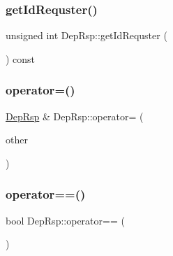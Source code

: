 \mbox{\label{class_dep_rsp_a3c858b0cb735e9e6309e8bf25bf272dd}} 
\subsubsection{\texorpdfstring{get\+Id\+Requster()}{getIdRequster()}}
{\footnotesize\ttfamily unsigned int Dep\+Rsp\+::get\+Id\+Requster (\begin{DoxyParamCaption}{ }\end{DoxyParamCaption}) const\hspace{0.3cm}{\ttfamily [virtual]}}

\mbox{\label{class_dep_rsp_a3297f65b6eb05d7d5d203562b4d48c4a}} 
\subsubsection{\texorpdfstring{operator=()}{operator=()}}
{\footnotesize\ttfamily \hyperlink{class_dep_rsp}{Dep\+Rsp} \& Dep\+Rsp\+::operator= (\begin{DoxyParamCaption}\item[{const \hyperlink{class_dep_rsp}{Dep\+Rsp} \&}]{other }\end{DoxyParamCaption})}

\mbox{\label{class_dep_rsp_a4796a7a035aa6f4b9deb40498731a941}} 
\subsubsection{\texorpdfstring{operator==()}{operator==()}}
{\footnotesize\ttfamily bool Dep\+Rsp\+::operator== (\begin{DoxyParamCaption}\item[{const \hyperlink{class_dep_rsp}{Dep\+Rsp} \&}]{ }\end{DoxyParamCaption})\hspace{0.3cm}{\ttfamily [protected]}}

\mbox{\label{class_dep_rsp_a2125eed5bc70db3cc55e41e144c8716f}} 
